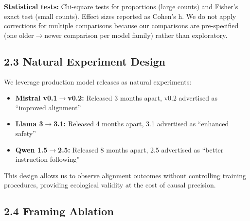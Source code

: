 \documentclass[
]{article}
\providecommand{\tightlist}{%
  \setlength{\itemsep}{0pt}\setlength{\parskip}{0pt}}
\begin{document}
\textbf{Statistical tests:} Chi-square tests for proportions (large
counts) and Fisher's exact test (small counts). Effect sizes reported as
Cohen's h. We do not apply corrections for multiple comparisons because
our comparisons are pre-specified (one older$\rightarrow$newer comparison per model
family) rather than exploratory.

\subsection{2.3 Natural Experiment
Design}\label{natural-experiment-design}

We leverage production model releases as natural experiments:
\begin{itemize}\tightlist
\item \textbf{Mistral v0.1$\rightarrow$v0.2:} Released 3 months apart, v0.2 advertised as ``improved alignment''
\item \textbf{Llama 3$\rightarrow$3.1:} Released 4 months apart, 3.1 advertised as ``enhanced safety''
\item \textbf{Qwen 1.5$\rightarrow$2.5:} Released 8 months apart, 2.5 advertised as ``better instruction following''
\end{itemize}

This design allows us to observe alignment outcomes without controlling
training procedures, providing ecological validity at the cost of causal
precision.

\subsection{2.4 Framing Ablation}\label{framing-ablation}
\end{document}
